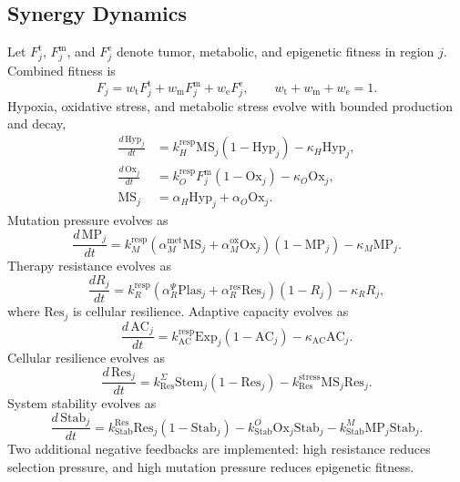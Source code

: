 \documentclass[12pt,a4paper]{article}
\begin{document}
\subsection{Synergy Dynamics}

Let $F^{\mathrm{t}}_j$, $F^{\mathrm{m}}_j$, and $F^{\mathrm{e}}_j$ denote tumor, metabolic, and epigenetic fitness in region $j$. Combined fitness is
\begin{equation}
F_j = w_{\mathrm{t}} F^{\mathrm{t}}_j + w_{\mathrm{m}} F^{\mathrm{m}}_j + w_{\mathrm{e}} F^{\mathrm{e}}_j, \qquad w_{\mathrm{t}} + w_{\mathrm{m}} + w_{\mathrm{e}} = 1.
\end{equation}
Hypoxia, oxidative stress, and metabolic stress evolve with bounded production and decay,
\begin{align}
\frac{d\,\mathrm{Hyp}_j}{dt} &= k_H^{\mathrm{resp}} \mathrm{MS}_j (1 - \mathrm{Hyp}_j) - \kappa_H \mathrm{Hyp}_j, \\
\frac{d\,\mathrm{Ox}_j}{dt} &= k_O^{\mathrm{resp}} F^{\mathrm{m}}_j (1 - \mathrm{Ox}_j) - \kappa_O \mathrm{Ox}_j, \\
\mathrm{MS}_j &= \alpha_H \mathrm{Hyp}_j + \alpha_O \mathrm{Ox}_j.
\end{align}
Mutation pressure evolves as
\begin{equation}
\frac{d\,\mathrm{MP}_j}{dt} = k_M^{\mathrm{resp}}\!\left(\alpha_M^{\mathrm{met}} \mathrm{MS}_j + \alpha_M^{\mathrm{ox}} \mathrm{Ox}_j\right) (1 - \mathrm{MP}_j) - \kappa_M \mathrm{MP}_j.
\end{equation}
Therapy resistance evolves as
\begin{equation}
\frac{dR_j}{dt} = k_R^{\mathrm{resp}}\!\left(\alpha_R^{\Psi} \mathrm{Plas}_j + \alpha_R^{\mathrm{res}} \mathrm{Res}_j\right)(1 - R_j) - \kappa_R R_j,
\end{equation}
where $\mathrm{Res}_j$ is cellular resilience. Adaptive capacity evolves as
\begin{equation}
\frac{d\,\mathrm{AC}_j}{dt} = k_{\mathrm{AC}}^{\mathrm{resp}} \mathrm{Exp}_j (1 - \mathrm{AC}_j) - \kappa_{\mathrm{AC}} \mathrm{AC}_j.
\end{equation}
Cellular resilience evolves as
\begin{equation}
\frac{d\,\mathrm{Res}_j}{dt} = k_{\mathrm{Res}}^{\Sigma} \mathrm{Stem}_j (1 - \mathrm{Res}_j) - k_{\mathrm{Res}}^{\mathrm{stress}} \mathrm{MS}_j \mathrm{Res}_j.
\end{equation}
System stability evolves as
\begin{equation}
\frac{d\,\mathrm{Stab}_j}{dt} = k_{\mathrm{Stab}}^{\mathrm{Res}} \mathrm{Res}_j (1 - \mathrm{Stab}_j) - k_{\mathrm{Stab}}^{O} \mathrm{Ox}_j \mathrm{Stab}_j - k_{\mathrm{Stab}}^{M} \mathrm{MP}_j \mathrm{Stab}_j.
\end{equation}
Two additional negative feedbacks are implemented: high resistance reduces selection pressure, and high mutation pressure reduces epigenetic fitness.
\end{document}
